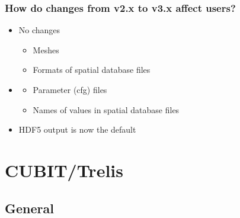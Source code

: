 \documentclass[aspectratio=169]{beamer}
\begin{document}
\begin{frame}
  \frametitle{How do changes from v2.x to v3.x affect users?}
  \summary{}

  \begin{itemize}
  \item No changes
    \begin{itemize}
    \item Meshes
    \item Formats of spatial database files
    \end{itemize}
  \item {}
    \begin{itemize}
    \item Parameter (cfg) files
    \item Names of values in spatial database files
    \end{itemize}
  \item HDF5 output is now the default
  \end{itemize}
  
\end{frame}


\section{CUBIT/Trelis}
\subsection{General}
\end{document}
